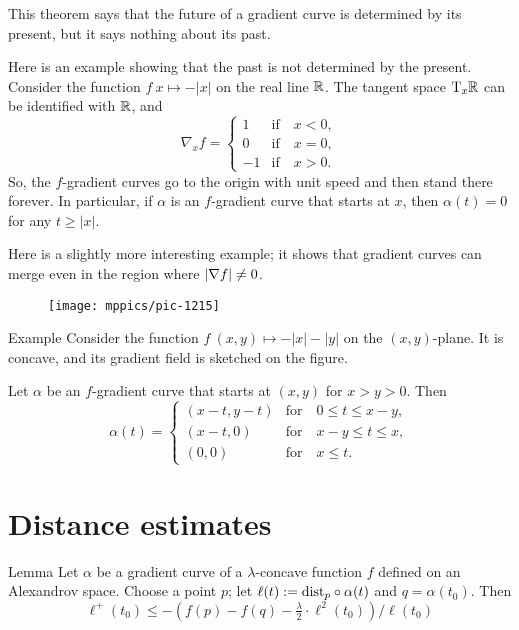 This theorem says that the future of a gradient curve is determined by its present, but it says nothing about its past.

Here is an example showing that the past is not determined by the present.
Consider the function $f\:x\mapsto -|x|$ on the real line $\mathbb{R}$.
The tangent space $\mathrm{T}_x\mathbb{R}$ can be identified with $\mathbb{R}$, and
\[\nabla_xf=
\begin{cases}
1&\text{if}\quad x<0,
\\
0&\text{if}\quad x=0,
\\
-1&\text{if}\quad x>0.
\end{cases}
\]
So, the $f$-gradient curves go to the origin with unit speed and then stand there forever.
In particular, if $\alpha$ is an $f$-gradient curve that starts at $x$,
then $\alpha(t)=0$ for any $t\ge |x|$.

Here is a slightly more interesting example;
it shows that gradient curves can merge even in the region where $|\nabla f|\ne 0$. 


\begin{wrapfigure}[8]{r}{34 mm}
\vskip-0mm
\centering
\texttt{[image: mppics/pic-1215]}
\vskip0mm
\end{wrapfigure}

\begin{thm}{Example}
Consider the function $f\:(x,y)\mapsto-|x|-|y|$ on the $(x,y)$-plane.
It is concave, and its gradient field is sketched on the figure.

Let $\alpha$ be an $f$-gradient curve that starts at $(x,y)$ for $x>y>0$.
Then 
\[\alpha(t)=
\begin{cases}
(x-t,y-t) &\text{for}\quad 0\le t\le  x-y,
\\
(x-t,0) &\text{for}\quad x-y\le t\le  x,
\\
(0,0) &\text{for}\quad x\le t.
\end{cases}
\]

\end{thm}


\section{Distance estimates}

\begin{thm}{Lemma}\label{eq:fist-var-inq+}
Let $\alpha$ be a gradient curve of a $\lambda$-concave function $f$ 
defined on an Alexandrov space.
Choose a point $p$; let $\ell(t)\mathrel{:=}\mathrm{dist}_p\circ\alpha(t)$ and $q=\alpha(t_0)$.
Then 
\[
\ell^+(t_0)\le -\left({f(p)}-{f(q)}-\tfrac\lambda2\cdot\ell^2(t_0)\right)/\ell(t_0)
\]
\end{thm}

